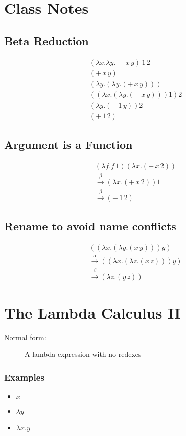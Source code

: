 \documentclass[]{article}
\begin{document}
\section*{Class Notes}
\subsection*{Beta Reduction}
\begin{align*}
&(\lambda x.\lambda y.+\,x\,y)\,1\,2 \\
&(+\,x\,y) \\
&(\lambda y.(\lambda y.(+\,x\,y))) \\
&((\lambda x.(\lambda y.(+\,x\,y)))1)2 \\
&(\lambda y.(+\,1\,y)) 2 \\
&(+\,1\,2)
\end{align*}

\subsection*{Argument is a Function}
\begin{align*}
&(\lambda f.f\,1)(\lambda x.(+\,x\,2)) \\
&\overset{\beta}{\rightarrow} (\lambda x.(+\,x\,2)) 1\\
&\overset{\beta}{\rightarrow} (+\,1\,2)
\end{align*}

\subsection*{Rename to avoid name conflicts}
\begin{align*}
&((\lambda x.(\lambda y.(x\,y))) y) \\
&\overset{\alpha}{\rightarrow} ((\lambda x.(\lambda z.(x\,z))) y) \\
&\overset{\beta}{\rightarrow} (\lambda z.(y\,z))
\end{align*}

\section*{The Lambda Calculus II}
\begin{description}
\item[Normal form:] A lambda expression with no redexes
\end{description}
\subsubsection*{Examples}
\begin{itemize}
\item $x$
\item $\lambda y$
\item $\lambda x.y$
\end{itemize}
\end{document}
